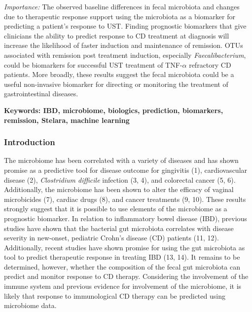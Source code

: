 \documentclass[12pt,]{article}
\begin{document}
\emph{Importance:} The observed baseline differences in fecal microbiota
and changes due to therapeutic response support using the microbiota as
a biomarker for predicting a patient's response to UST. Finding
prognostic biomarkers that give clinicians the ability to predict
response to CD treatment at diagnosis will increase the likelihood of
faster induction and maintenance of remission. OTUs associated with
remission post treatment induction, especially \emph{Faecalibacterium},
could be biomarkers for successful UST treatment of TNF-\({\alpha}\)
refractory CD patients. More broadly, these results suggest the fecal
microbiota could be a useful non-invasive biomarker for directing or
monitoring the treatment of gastrointestinal diseases.

\textbf{Keywords: IBD, microbiome, biologics, prediction, biomarkers,
remission, Stelara, machine learning}

\newpage

\subsubsection{Introduction}\label{introduction}

The microbiome has been correlated with a variety of diseases and has
shown promise as a predictive tool for disease outcome for gingivitis
(1), cardiovascular disease (2), \emph{Clostridium difficile} infection
(3, 4), and colorectal cancer (5, 6). Additionally, the microbiome has
been shown to alter the efficacy of vaginal microbicides (7), cardiac
drugs (8), and cancer treatments (9, 10). These results strongly suggest
that it is possible to use elements of the microbiome as a prognostic
biomarker. In relation to inflammatory bowel disease (IBD), previous
studies have shown that the bacterial gut microbiota correlates with
disease severity in new-onset, pediatric Crohn's disease (CD) patients
(11, 12). Additionally, recent studies have shown promise for using the
gut microbiota as tool to predict therapeutic response in treating IBD
(13, 14). It remains to be determined, however, whether the composition
of the fecal gut microbiota can predict and monitor response to CD
therapy. Considering the involvement of the immune system and previous
evidence for involvement of the microbiome, it is likely that response
to immunological CD therapy can be predicted using microbiome data.
\end{document}
